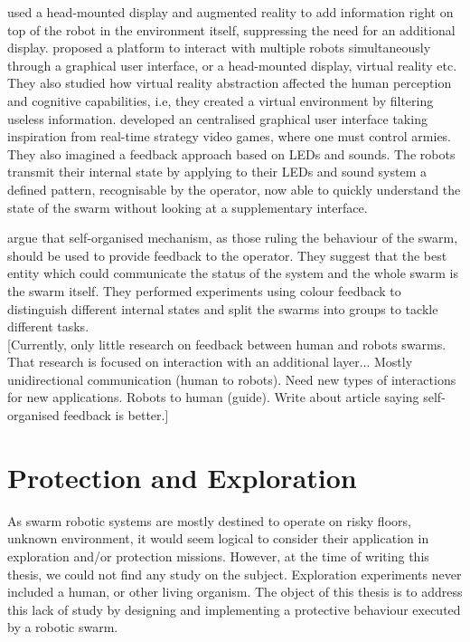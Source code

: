 \documentclass[a4paper, 12pt]{report}
\begin{document}
	\citet{daily2003world} used a head-mounted display and augmented reality to add information right on top of the robot in the environment itself, suppressing the need for an additional display. \citet{baizid2009human} proposed a platform to interact with multiple robots simultaneously through a graphical user interface, or a head-mounted display, virtual reality etc. They also studied how virtual reality abstraction affected the human perception and cognitive capabilities, i.e, they created a virtual environment by filtering useless information. \citet{mclurkin2006speaking} developed an centralised graphical user interface taking inspiration from real-time strategy video games, where one must control armies. They also imagined a feedback approach based on LEDs and sounds. The robots transmit their internal state by applying to their LEDs and sound system a defined pattern, recognisable by the operator, now able to quickly understand the state of the swarm without looking at a supplementary interface.
	
	\citet{podevijn2012self} argue that self-organised mechanism, as those ruling the behaviour of the swarm, should be used to provide feedback to the operator. They suggest that the best entity which could communicate the status of the system and the whole swarm is the swarm itself. They performed experiments using colour feedback to distinguish different internal states and split the swarms into groups to tackle different tasks.\\
	
	
[Currently, only little research on feedback between human and robots swarms. That research is focused on interaction with an additional layer... Mostly unidirectional communication (human to robots). Need new types of interactions for new applications. Robots to human (guide). Write about article saying self-organised feedback is better.] 



	\section{Protection and Exploration}
	
	As swarm robotic systems are mostly destined to operate on risky floors, unknown environment, it would seem logical to consider their application in exploration and/or protection missions. However, at the time of writing this thesis, we could not find any study on the subject. Exploration experiments never included a human, or other living organism. The object of this thesis is to address this lack of study by designing and implementing a protective behaviour executed by a robotic swarm.
	
\end{document}
